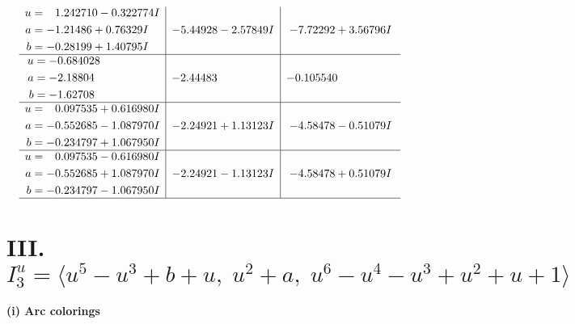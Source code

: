 \documentclass[1p]{elsarticle_modified}
\theoremstyle{definition}
\begin{document}
$$\begin{array}{c|c|c}
\begin{aligned}
u &= \phantom{-}1.242710 - 0.322774 I \\
a &= -1.21486 + 0.76329 I \\
b &= -0.28199 + 1.40795 I\end{aligned}
 & -5.44928 - 2.57849 I & -7.72292 + 3.56796 I \\ \hline\begin{aligned}
u &= -0.684028\phantom{ +0.000000I} \\
a &= -2.18804\phantom{ +0.000000I} \\
b &= -1.62708\phantom{ +0.000000I}\end{aligned}
 & -2.44483\phantom{ +0.000000I} & -0.105540\phantom{ +0.000000I} \\ \hline\begin{aligned}
u &= \phantom{-}0.097535 + 0.616980 I \\
a &= -0.552685 - 1.087970 I \\
b &= -0.234797 + 1.067950 I\end{aligned}
 & -2.24921 + 1.13123 I & -4.58478 - 0.51079 I \\ \hline\begin{aligned}
u &= \phantom{-}0.097535 - 0.616980 I \\
a &= -0.552685 + 1.087970 I \\
b &= -0.234797 - 1.067950 I\end{aligned}
 & -2.24921 - 1.13123 I & -4.58478 + 0.51079 I\\
 \hline 
 \end{array}$$\newpage\newpage\renewcommand{\arraystretch}{1}
\centering \section*{III. $I^u_{3}= \langle u^5- u^3+b+u,\;u^2+a,\;u^6- u^4- u^3+u^2+u+1 \rangle$}
\flushleft \textbf{(i) Arc colorings}\\
\end{document}

